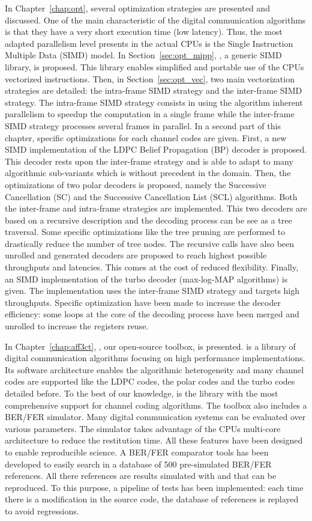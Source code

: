 In Chapter~\ref{chap:opt}, several optimization strategies are presented and
discussed. One of the main characteristic of the digital communication
algorithms is that they have a very short execution time (low latency). Thus,
the most adapted parallelism level presents in the actual CPUs is the Single
Instruction Multiple Data (SIMD) model. In Section~\ref{sec:opt_mipp}, \MIPP, a
generic SIMD library, is proposed. This library enables simplified and portable
use of the CPUs vectorized instructions. Then, in Section~\ref{sec:opt_vec}, two
main vectorization strategies are detailed: the intra-frame SIMD strategy and
the inter-frame SIMD strategy. The intra-frame SIMD strategy consists in using
the algorithm inherent parallelism to speedup the computation in a single frame
while the inter-frame SIMD strategy processes several frames in parallel.
In a second part of this chapter, specific optimizations for each channel codes
are given. First, a new SIMD implementation of the LDPC Belief Propagation (BP)
decoder is proposed. This decoder rests upon the inter-frame strategy and is
able to adapt to many algorithmic sub-variants which is without precedent in the
domain. Then, the optimizations of two polar decoders is proposed, namely the
Successive Cancellation (SC) and the Successive Cancellation List (SCL)
algorithms. Both the inter-frame and intra-frame strategies are implemented.
This two decoders are based on a recursive description and the decoding process
can be see as a tree traversal. Some specific optimizations like the tree
pruning are performed to drastically reduce the number of tree nodes. The
recursive calls have also been unrolled and generated decoders are proposed to
reach highest possible throughputs and latencies. This comes at the cost of
reduced flexibility. Finally, an SIMD implementation of the turbo decoder
(max-log-MAP algorithms) is given. The implementation uses the inter-frame
SIMD strategy and targets high throughputs. Specific optimization have been made
to increase the decoder efficiency: some loops at the core of the decoding
process have been merged and unrolled to increase the registers reuse.

In Chapter~\ref{chap:aff3ct}, \AFFECT, our open-source toolbox, is presented.
\AFFECT is a library of digital communication algorithms focusing on high
performance implementations. Its software architecture enables the algorithmic
heterogeneity and many channel codes are supported like the LDPC codes, the
polar codes and the turbo codes detailed before. To the best of our knowledge,
\AFFECT is the library with the most comprehensive support for channel coding
algorithms. The toolbox also includes a BER/FER simulator. Many digital
communication systems can be evaluated over various parameters. The simulator
takes advantage of the CPUs multi-core architecture to reduce the restitution
time. All these features have been designed to enable reproducible science.
A BER/FER comparator tools has been developed to easily search in a database of
500 pre-simulated BER/FER references. All there references are results simulated
with \AFFECT and that can be reproduced. To this purpose, a pipeline of tests
has been implemented: each time there is a modification in the source code, the
database of references is replayed to avoid regressions.

